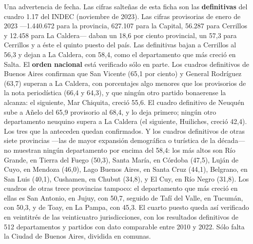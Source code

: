 \begin{cautela}
Una advertencia de fecha. Las cifras salteñas de esta ficha son las \textbf{definitivas} del cuadro 1.17 del INDEC (noviembre de 2023). Las cifras provisorias de enero de 2023 ---1.440.672 para la provincia, 627.107 para la Capital, 56.287 para Cerrillos y 12.458 para La Caldera--- daban un 18,6 por ciento provincial, un 57,3 para Cerrillos y a éste el quinto puesto del país. Las definitivas bajan a Cerrillos al 56,3 y dejan a La Caldera, con 58,4, como el departamento que más creció en Salta. El \textbf{orden nacional} está verificado sólo en parte. Los cuadros definitivos de Buenos Aires confirman que San Vicente (65,1 por ciento) y General Rodríguez (63,7) superan a La Caldera, con porcentajes algo menores que los provisorios de la nota periodística (66,4 y 64,3), y que ningún otro partido bonaerense la alcanza: el siguiente, Mar Chiquita, creció 55,6. El cuadro definitivo de Neuquén sube a Añelo del 65,9 provisorio al 68,4, y lo deja primero; ningún otro departamento neuquino supera a La Caldera (el siguiente, Huiliches, creció 42,4). Los tres que la anteceden quedan confirmados. Y los cuadros definitivos de otras siete provincias ---las de mayor expansión demográfica o turística de la década--- no muestran ningún departamento por encima del 58,4: los más altos son Río Grande, en Tierra del Fuego (50,3), Santa María, en Córdoba (47,5), Luján de Cuyo, en Mendoza (46,0), Lago Buenos Aires, en Santa Cruz (44,1), Belgrano, en San Luis (40,1), Cushamen, en Chubut (34,8), y El Cuy, en Río Negro (31,8). Los cuadros de otras trece provincias tampoco: el departamento que más creció en ellas es San Antonio, en Jujuy, con 50,7, seguido de Tafí del Valle, en Tucumán, con 50,3, y de Toay, en La Pampa, con 45,3. El cuarto puesto queda así verificado en veintitrés de las veinticuatro jurisdicciones, con los resultados definitivos de 512 departamentos y partidos con dato comparable entre 2010 y 2022. Sólo falta la Ciudad de Buenos Aires, dividida en comunas. 
\end{cautela}

